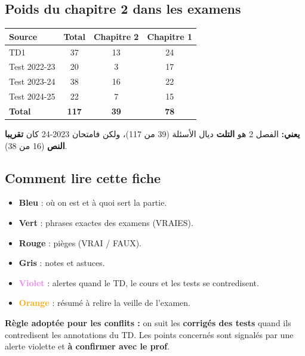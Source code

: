 \documentclass[11pt,a4paper]{article}
\begin{document}
\subsection*{Poids du chapitre 2 dans les examens}
\begin{center}
\begin{tabular}{lccc}
\toprule
\textbf{Source} & \textbf{Total} & \textbf{Chapitre 2} & \textbf{Chapitre 1} \\
\midrule
TD1 & 37 & 13 & 24 \\
Test 2022-23 & 20 & 3 & 17 \\
Test 2023-24 & 38 & 16 & 22 \\
Test 2024-25 & 22 & 7 & 15 \\
\midrule
\textbf{Total} & \textbf{117} & \textbf{39} & \textbf{78} \\
\bottomrule
\end{tabular}
\end{center}
\par\begin{Arabic}
\textbf{يعني:} الفصل 2 هو \textbf{التلت} ديال الأسئلة (39 من 117)، ولكن فامتحان 2023-24 كان \textbf{تقريبا النص} (16 من 38).
\end{Arabic}

\subsection*{Comment lire cette fiche}
\begin{itemize}
\item \textcolor{bleu}{\textbf{Bleu}} : où on est et à quoi sert la partie.
\item \textcolor{vert}{\textbf{Vert}} : phrases exactes des examens (VRAIES).
\item \textcolor{rouge}{\textbf{Rouge}} : pièges (VRAI / FAUX).
\item \textcolor{gris}{\textbf{Gris}} : notes et astuces.
\item \textcolor{violet}{\textbf{Violet}} : alertes quand le TD, le cours et les tests se contredisent.
\item \textcolor{orange}{\textbf{Orange}} : résumé à relire la veille de l'examen.
\end{itemize}

\begin{alerte}
\textbf{Règle adoptée pour les conflits :} on suit les \textbf{corrigés des tests} quand ils contredisent les annotations du TD. Les points concernés sont signalés par une alerte violette et \textbf{à confirmer avec le prof}.
\end{alerte}
\end{document}
